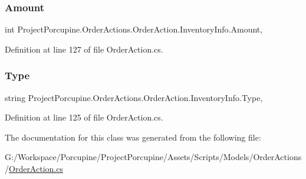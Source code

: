 \subsubsection{\texorpdfstring{Amount}{Amount}}
{\footnotesize\ttfamily int Project\+Porcupine.\+Order\+Actions.\+Order\+Action.\+Inventory\+Info.\+Amount\hspace{0.3cm}{\ttfamily [get]}, {\ttfamily [set]}}



Definition at line 127 of file Order\+Action.\+cs.

\mbox{\label{class_project_porcupine_1_1_order_actions_1_1_order_action_1_1_inventory_info_adaaafc68d7ac7e114cacddc12909759b}} 
\subsubsection{\texorpdfstring{Type}{Type}}
{\footnotesize\ttfamily string Project\+Porcupine.\+Order\+Actions.\+Order\+Action.\+Inventory\+Info.\+Type\hspace{0.3cm}{\ttfamily [get]}, {\ttfamily [set]}}



Definition at line 125 of file Order\+Action.\+cs.



The documentation for this class was generated from the following file\+:\begin{DoxyCompactItemize}
\item 
G\+:/\+Workspace/\+Porcupine/\+Project\+Porcupine/\+Assets/\+Scripts/\+Models/\+Order\+Actions/\hyperlink{_order_action_8cs}{Order\+Action.\+cs}\end{DoxyCompactItemize}
